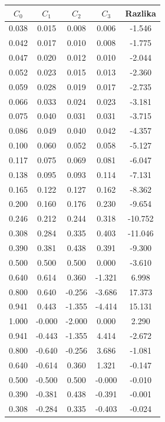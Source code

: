\documentclass[12pt,a4paper]{report}
\begin{document}
\begin{table}
	\begin{center}		
		\begin{tabular}{c c c c | c}
			$C_0$&$C_1$&$C_2$&$C_3$&Razlika\\\hline
0.038  & 0.015  & 0.008  & 0.006 & -1.546 \\
0.042  & 0.017  & 0.010  & 0.008 & -1.775 \\
0.047  & 0.020  & 0.012  & 0.010 & -2.044 \\
0.052  & 0.023  & 0.015  & 0.013 & -2.360 \\
0.059  & 0.028  & 0.019  & 0.017 & -2.735 \\
0.066  & 0.033  & 0.024  & 0.023 & -3.181 \\
0.075  & 0.040  & 0.031  & 0.031 & -3.715 \\
0.086  & 0.049  & 0.040  & 0.042 & -4.357 \\
0.100  & 0.060  & 0.052  & 0.058 & -5.127 \\
0.117  & 0.075  & 0.069  & 0.081 & -6.047 \\
0.138  & 0.095  & 0.093  & 0.114 & -7.131 \\
0.165  & 0.122  & 0.127  & 0.162 & -8.362 \\
0.200  & 0.160  & 0.176  & 0.230 & -9.654 \\
0.246  & 0.212  & 0.244  & 0.318 & -10.752 \\
0.308  & 0.284  & 0.335  & 0.403 & -11.046 \\
0.390  & 0.381  & 0.438  & 0.391 & -9.300 \\
0.500  & 0.500  & 0.500  & 0.000 & -3.610 \\
0.640  & 0.614  & 0.360  & -1.321 & 6.998 \\
0.800  & 0.640  & -0.256  & -3.686 & 17.373 \\
0.941  & 0.443  & -1.355  & -4.414 & 15.131 \\
1.000  & -0.000  & -2.000  & 0.000 & 2.290 \\
0.941  & -0.443  & -1.355  & 4.414 & -2.672 \\
0.800  & -0.640  & -0.256  & 3.686 & -1.081 \\
0.640  & -0.614  & 0.360  & 1.321 & -0.147 \\
0.500  & -0.500  & 0.500  & -0.000 & -0.010 \\
0.390  & -0.381  & 0.438  & -0.391 & -0.001 \\
0.308  & -0.284  & 0.335  & -0.403 & -0.024 \\

\end{tabular}
\end{center}
\end{table}
\end{document}
